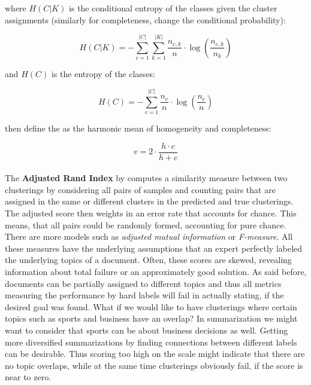     where $H(C|K)$ is the conditional entropy of the classes given the cluster assignments (similarly for completeness, change the conditional probability):

      \begin{equation}
        H(C|K) = - \sum_{c=1}^{|C|} \sum_{k=1}^{|K|} \frac{n_{c,k}}{n}\cdot \log\left(\frac{n_{c,k}}{n_k}\right)
      \end{equation}

    and $H(C)$ is the entropy of the classes:

      \begin{equation}
        H(C) = - \sum_{c=1}^{|C|} \frac{n_c}{n} \cdot \log\left(\frac{n_c}{n}\right)
      \end{equation}

    \cite{VMeasure2007} then define the \vmeasure{} as the harmonic mean of homogeneity and completeness:

      \begin{equation}
        v = 2 \cdot \frac{h \cdot c}{h + c}
      \end{equation}

    \paragraph{} The \textbf{Adjusted Rand Index} by \cite{RandIndex1971} computes a similarity measure between two clusterings by considering all pairs of samples and counting pairs that are assigned in the same or different clusters in the predicted and true clusterings. The adjusted score then weights in an error rate that accounts for chance. This means, that all pairs could be randomly formed, accounting for pure chance.\\

  There are more models such as \emph{adjusted mutual information} or \emph{F-measure}. All these measures have the underlying assumptions that an expert perfectly labeled the underlying topics of a document. Often, these scores are skewed, revealing information about total failure or an approximately good solution. As said before, documents can be partially assigned to different topics and thus all metrics measuring the performance by hard labels will fail in actually stating, if the desired goal was found. What if we would like to have clusterings where certain topics such as sports and business have an overlap? In summarization we might want to consider that sports can be about business decisions as well. Getting more diversified summarizations by finding connections between different labels can be desirable. Thus scoring too high on the \vmeasure{} scale might indicate that there are no topic overlaps, while at the same time clusterings obviously fail, if the score is near to zero.

